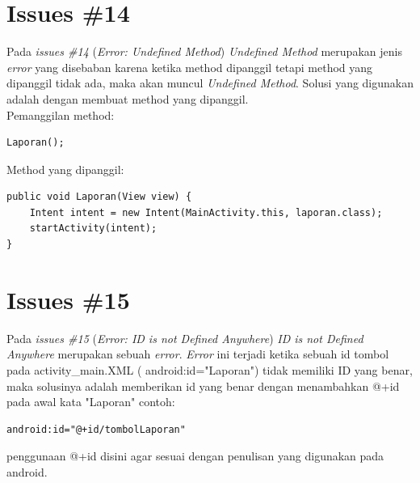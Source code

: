 \section{Issues \#14}
Pada \textit{issues \#14} (\textit{Error: Undefined Method}) \textit{Undefined Method} merupakan jenis \textit{error} yang disebaban karena ketika method dipanggil tetapi method yang dipanggil tidak ada, maka akan muncul \textit{Undefined Method}. Solusi yang digunakan adalah dengan membuat method yang dipanggil.\\
Pemanggilan method:
\begin{verbatim}
Laporan();
\end{verbatim}
Method yang dipanggil:
\begin{verbatim}
public void Laporan(View view) {
    Intent intent = new Intent(MainActivity.this, laporan.class);
    startActivity(intent);
}
\end{verbatim}


\section{Issues \#15}
Pada \textit{issues \#15} (\textit{Error: ID is not Defined Anywhere}) \textit{ID is not Defined Anywhere} merupakan sebuah \textit{error}. \textit{Error} ini terjadi ketika sebuah id tombol pada activity\_main.XML ( android:id="Laporan") tidak memiliki ID yang benar, maka solusinya adalah memberikan id yang benar dengan menambahkan @+id pada awal kata "Laporan" contoh:
\begin{verbatim}
android:id="@+id/tombolLaporan"
\end{verbatim}
penggunaan @+id disini agar sesuai dengan penulisan yang digunakan pada android. 


